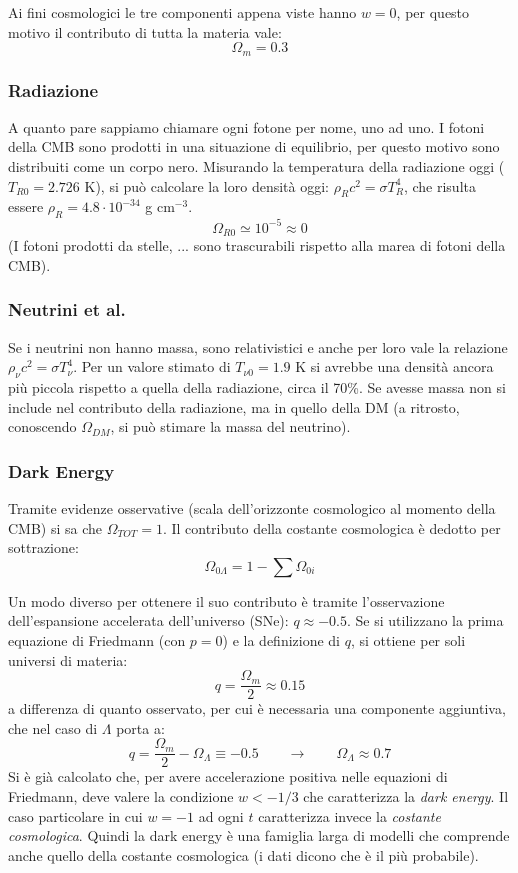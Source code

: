 Ai fini cosmologici le tre componenti appena viste hanno $w=0$, per questo motivo il contributo di tutta la materia vale:
\begin{equation}
    \Omega_{m}= 0.3
\end{equation}

\subsubsection{Radiazione}
A quanto pare sappiamo chiamare ogni fotone per nome, uno ad uno. I fotoni della CMB sono prodotti in una situazione di equilibrio, per questo motivo sono distribuiti come un corpo nero. Misurando la temperatura della radiazione oggi ($T_{R0}=2.726$ K), si può calcolare la loro densità oggi: $\rho_R c^2 = \sigma T_R^4$, che risulta essere $\rho_R=4.8\cdot 10^{-34}$ g cm$^{-3}$.
\begin{equation}
    \Omega_{R0}\simeq 10^{-5}\approx 0
\end{equation}
(I fotoni prodotti da stelle, ... sono trascurabili rispetto alla marea di fotoni della CMB).

\subsubsection{Neutrini et al.}
Se i neutrini non hanno massa, sono relativistici e anche per loro vale la relazione $\rho_\nu c^2 = \sigma T_\nu^4$. Per un valore stimato di $T_{\nu 0}=1.9$ K si avrebbe una densità ancora più piccola rispetto a quella della radiazione, circa il 70\%. Se avesse massa non si include nel contributo della radiazione, ma in quello della DM (a ritrosto, conoscendo $\Omega_{DM}$, si può stimare la massa del neutrino).

\subsubsection{Dark Energy}
Tramite evidenze osservative (scala dell'orizzonte cosmologico al momento della CMB) si sa che $\Omega_{TOT}=1$.
Il contributo della costante cosmologica è dedotto per sottrazione:
\begin{equation}
    \Omega_{0\Lambda} = 1 - \sum \Omega_{0i}
\end{equation}

Un modo diverso per ottenere il suo contributo è tramite l'osservazione dell'espansione accelerata dell'universo (SNe): $q \approx -0.5$. Se si utilizzano la prima equazione di Friedmann (con $p=0$) e la definizione di $q$, si ottiene per soli universi di materia:
$$
q = \frac{\Omega_m}{2}\approx 0.15
$$
a differenza di quanto osservato, per cui è necessaria una componente aggiuntiva, che nel caso di $\Lambda$ porta a:
$$
q = \frac{\Omega_m}{2} -\Omega_\Lambda \equiv -0.5 \qquad\rightarrow\qquad \Omega_\Lambda \approx 0.7
$$
Si è già calcolato che, per avere accelerazione positiva nelle equazioni di Friedmann, deve valere la condizione $w< -1/3$ che caratterizza la \textit{dark energy}. Il caso particolare in cui $w=-1$ ad ogni $t$ caratterizza invece la \textit{costante cosmologica}. Quindi la dark energy è una famiglia larga di modelli che comprende anche quello della costante cosmologica (i dati dicono che è il più probabile).

